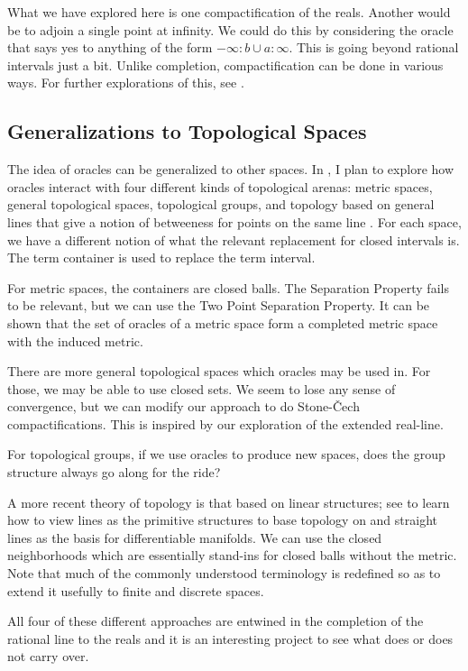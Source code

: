 \documentclass[12pt]{article}
\begin{document}
What we have explored here is one compactification of the reals. Another would be to adjoin a single point at infinity. We could do this by considering the oracle that says yes to anything of the form $-\infty:b \cup a:\infty$. This is going beyond rational intervals just a bit. Unlike completion, compactification can be done in various ways. For further explorations of this, see \cite{taylor23metric}. 


\subsection{Generalizations to Topological Spaces}

The idea of oracles can be generalized to other spaces. In \cite{taylor23metric}, I plan to explore how oracles interact with four different kinds of topological arenas: metric spaces, general topological spaces, topological groups, and topology based on general lines that give a notion of betweeness for points on the same line \cite{maudlin}. For each space, we have a different notion of what the relevant replacement for closed intervals is. The term container is used to replace the term interval.

For metric spaces, the containers are closed balls. The Separation Property fails to be relevant, but we can use the Two Point Separation Property. It can be shown that the set of oracles of a metric space form a completed metric space with the induced metric. 

There are more general topological spaces which oracles may be used in. For those, we may be able to use closed sets. We seem to lose any sense of convergence, but we can modify our approach to do Stone-\v{C}ech compactifications. This is inspired by our exploration of the extended real-line. 

For topological groups, if we use oracles to produce new spaces, does the group structure always go along for the ride? 

A more recent theory of topology is that based on linear structures; see \cite{maudlin} to learn how to view lines as the primitive structures to base topology on and straight lines as the basis for differentiable manifolds. We can use the closed neighborhoods which are essentially stand-ins for closed balls without the metric. Note that much of the commonly understood terminology is redefined so as to extend it usefully to finite and discrete spaces. 

All four of these different approaches are entwined in the completion of the rational line to the reals and it is an interesting project to see what does or does not carry over. 
\end{document}
